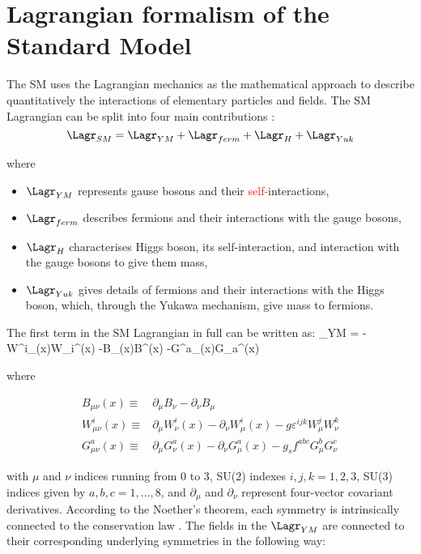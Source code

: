 \section{Lagrangian formalism of the Standard Model}


\indent The SM uses the Lagrangian mechanics as the mathematical approach to describe quantitatively the interactions of elementary particles and fields. 
The SM Lagrangian can be split into four main contributions \cite{Mozer:2016wzi}:
\begin{equation}\label{lagr_SM}
\Lagr_{SM} = \Lagr_{YM} + \Lagr_{ferm} + \Lagr_{H} + \Lagr_{Yuk} 
\end{equation}

\noindent where

\begin{itemize}
\item $\Lagr_{YM}$ represents gause bosons and their \textcolor{red}{self-}interactions,
\item $\Lagr_{ferm}$ describes fermions and their interactions with the gauge bosons, 
\item $\Lagr_{H}$ characterises Higgs boson, its self-interaction, and interaction with the gauge bosons to give them mass, 
\item $\Lagr_{Yuk} $ gives details of fermions and their interactions with the Higgs boson, which, through the Yukawa mechanism, give mass to fermions.
\end{itemize}
 

The first term in the SM Lagrangian in full can be written as:
\beqn\label{lagr_YM}
\Lagr_{YM} = 	-W^i_{\mu\nu}(x)W_i^{\mu\nu}(x) -B_{\mu\nu}(x)B^{\mu\nu}(x) -G^a_{\mu\nu}(x)G_a^{\mu\nu}(x)
\eeqn

\noindent where

\begin{align}
B_{\mu\nu}(x)   \equiv & \partial_\mu B_\nu -  \partial_\nu B_\mu \label{B_tensor} \\ 
W^i_{\mu\nu}(x) \equiv & \partial_\mu W^i_\nu(x) - \partial_\nu W^i_\mu(x) - g \varepsilon^{ijk}W^j_\mu W^k_\nu \label{W_tensor}\\
G^a_{\mu\nu}(x) \equiv & \partial_\mu G^a_\nu(x) - \partial_\nu G^a_\mu(x) - g_s f^{abc}G^b_\mu G^c_\nu \label{G_tensor}
\end{align}


\noindent with $\mu$ and $\nu$ indices running from 0 to 3, SU(2) indexes $i,j,k = 1,2,3$, SU(3) indices given by $a,b,c = 1, ..., 8$, and $\partial_\mu$ and $\partial_\nu$ represent four-vector covariant derivatives. According to the Noether's theorem, each symmetry is intrinsically connected to the conservation law \cite{Sardanashvily:2143630}. The fields in the $\Lagr_{YM} $ are connected to their corresponding underlying symmetries in the following way: 

